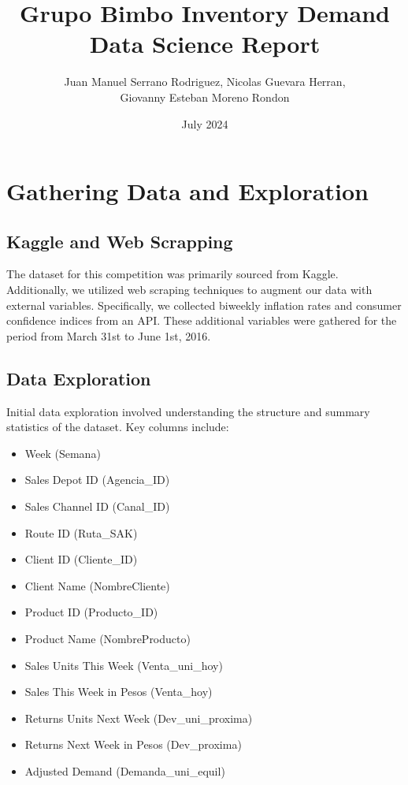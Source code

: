 \documentclass{article}
\title{Grupo Bimbo Inventory Demand \\Data Science Report }
\author{Juan Manuel Serrano Rodriguez, Nicolas Guevara Herran,\\ Giovanny Esteban Moreno Rondon}
\date{July 2024}
\begin{document}
\maketitle

\section{Gathering Data and Exploration}
\subsection{Kaggle and Web Scrapping}
The dataset for this competition was primarily sourced from Kaggle. Additionally, we utilized web scraping techniques to augment our data with external variables. Specifically, we collected biweekly inflation rates and consumer confidence indices from an API. These additional variables were gathered for the period from March 31st to June 1st, 2016.

\subsection{Data Exploration}

Initial data exploration involved understanding the structure and summary statistics of the dataset. Key columns include:

\begin{itemize}
    \item Week (Semana)
    \item Sales Depot ID (Agencia\_ID)
    \item Sales Channel ID (Canal\_ID)
    \item Route ID (Ruta\_SAK)
    \item Client ID (Cliente\_ID)
    \item Client Name (NombreCliente)
    \item Product ID (Producto\_ID)
    \item Product Name (NombreProducto)
    \item Sales Units This Week (Venta\_uni\_hoy)
    \item Sales This Week in Pesos (Venta\_hoy)
    \item Returns Units Next Week (Dev\_uni\_proxima)
    \item Returns Next Week in Pesos (Dev\_proxima)
    \item Adjusted Demand (Demanda\_uni\_equil)
\end{itemize}
\end{document}
